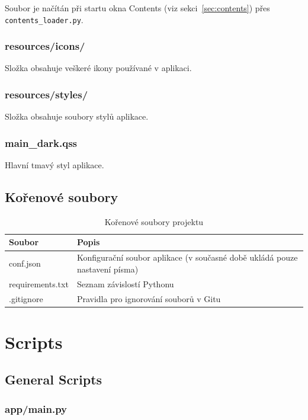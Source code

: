 \documentclass[FM,Proj]{tulthesis}
\begin{document}
Soubor je načítán při startu okna Contents (viz sekci~\ref{sec:contents})
přes \texttt{contents\_loader.py}.

\subsubsection{resources/icons/}

Složka obsahuje veškeré ikony používané v aplikaci.

\subsubsection{resources/styles/}

Složka obsahuje soubory stylů aplikace.

\subsubsection{main\_dark.qss}
Hlavní tmavý styl aplikace.

\subsection{Kořenové soubory}

\begin{table}[H]
	\centering
	\caption{Kořenové soubory projektu}
	\begin{tabularx}{\textwidth}{|l|X|}
		\hline
		\textbf{Soubor} & \textbf{Popis} \\ \hline
		conf.json        & Konfigurační soubor aplikace (v současné době ukládá pouze nastavení písma) \\ \hline
		requirements.txt & Seznam závislostí Pythonu \\ \hline
		.gitignore       & Pravidla pro ignorování souborů v Gitu \\ \hline
	\end{tabularx}
	\label{tab:root-files}
\end{table}

\clearpage
\section{Scripts}

\subsection{General Scripts}

\subsubsection{app/main.py}
\end{document}
